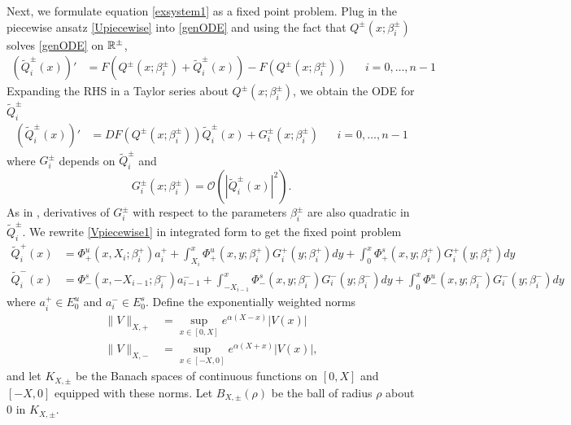 \documentclass[10pt,reqno]{amsart}
\theoremstyle{plain}
\theoremstyle{definition}
\theoremstyle{remark}
\numberwithin{theorem}{section}
\numberwithin{equation}{section}
\begin{document}
Next, we formulate equation \eqref{exsystem1} as a fixed point problem. Plug in the piecewise ansatz \eqref{Upiecewise} into \eqref{genODE} and using the fact that $Q^\pm(x; \beta_i^\pm)$ solves \eqref{genODE} on $\mathbb{R}^\pm$,
\begin{align*}
(\tilde{Q}_i^\pm(x))' &= F\left(Q^\pm(x; \beta_i^\pm) + \tilde{Q}_i^\pm(x) \right) - F(Q^\pm(x; \beta_i^\pm)) && i = 0, \dots, n-1
\end{align*}
Expanding the RHS in a Taylor series about $Q^\pm(x; \beta_i^\pm)$, we obtain the ODE for $\tilde{Q}_i^\pm$
\begin{align}\label{Vpiecewise1}
(\tilde{Q}_i^\pm(x))' &= DF(Q^\pm(x; \beta_i^\pm)) \tilde{Q}_i^\pm(x) + G_i^\pm(x; \beta_i^\pm) && i = 0, \dots, n-1
\end{align}
where $G_i^\pm$ depends on $\tilde{Q}_i^\pm$ and
\begin{equation}\label{Gquadratic}
G_i^\pm(x; \beta_i^\pm) = \mathcal{O}(|\tilde{Q}_i^\pm(x)|^2).
\end{equation}
As in \cite{Sandstede1997}, derivatives of $G_i^\pm$ with respect to the parameters $\beta_i^\pm$ are also quadratic in $\tilde{Q}_i^\pm$. We rewrite \eqref{Vpiecewise1} in integrated form to get the fixed point problem
\begin{equation}\label{FPequations}
\begin{aligned}
\tilde{Q}_i^+(x) &= \Phi^u_+(x, X_i; \beta_i^+) a_i^+  
+ \int_{X_i}^x \Phi_+^u(x, y; \beta_i^+) G_i^+(y; \beta_i^+)dy 
+ \int_0^x \Phi_+^s(x, y; \beta_i^+) G_i^+(y; \beta_i^+)dy \\ 
\tilde{Q}_i^-(x) &= \Phi^s_-(x, -X_{i-1}; \beta_i^-) a_{i-1}^-  
+\int_{-X_{i-1}}^x \Phi_-^s(x, y; \beta_i^-) G_i^-(y; \beta_i^-)dy 
+ \int_0^x \Phi_-^u(x, y; \beta_i^-) G_i^-(y; \beta_i^-)dy
\end{aligned}
\end{equation}
where $a_i^+ \in E_0^u$ and $a_i^- \in E_0^s$. Define the exponentially weighted norms
\begin{equation}\label{expwtnorm}
\begin{aligned}
\|V\|_{X, +} &= \sup_{x \in [0, X]} e^{\alpha(X - x)}|V(x)| \\
\|V\|_{X, -} &= \sup_{x \in [-X, 0]} e^{\alpha(X + x)}|V(x)|,
\end{aligned}
\end{equation}
and let $K_{X, \pm}$ be the Banach spaces of continuous functions on $[0, X]$ and $[-X, 0]$ equipped with these norms. Let $B_{X, \pm}(\rho)$ be the ball of radius $\rho$ about $0$ in $K_{X, \pm}$.
\end{document}
